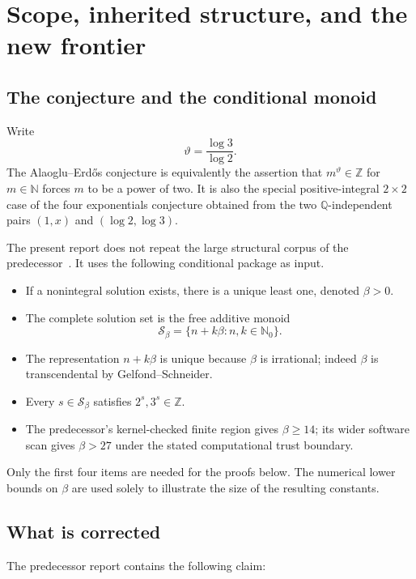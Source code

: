 \documentclass[11pt,oneside]{article}
\theoremstyle{definition}
\theoremstyle{remark}
\newcommand{\N}{\mathbb N}
\newcommand{\Nzero}{\mathbb N_0}
\newcommand{\Z}{\mathbb Z}
\newcommand{\Q}{\mathbb Q}
\newcommand{\Sbeta}{\mathcal S_\beta}
\begin{document}
\tableofcontents
\newpage
{}

\section{Scope, inherited structure, and the new frontier}
\label{sec:scope}

\subsection{The conjecture and the conditional monoid}

Write
\[
 \vartheta=\frac{\log3}{\log2}.
\]
The Alaoglu--Erd\H{o}s conjecture is equivalently the assertion that
$m^\vartheta\in\Z$ for $m\in\N$ forces $m$ to be a power of two.  It is also the special
positive-integral $2\times2$ case of the four exponentials conjecture obtained from the two
$\Q$-independent pairs $(1,x)$ and $(\log2,\log3)$.

The present report does not repeat the large structural corpus of the predecessor~\cite{Unified6}.  It uses
the following conditional package as input.

\begin{itemize}
\item If a nonintegral solution exists, there is a unique least one, denoted $\beta>0$.
\item The complete solution set is the free additive monoid
\[
 \Sbeta=\{n+k\beta:n,k\in\Nzero\}.
\]
\item The representation $n+k\beta$ is unique because $\beta$ is irrational; indeed
$\beta$ is transcendental by Gelfond--Schneider.
\item Every $s\in\Sbeta$ satisfies $2^s,3^s\in\Z$.
\item The predecessor's kernel-checked finite region gives $\beta\ge14$; its wider
software scan gives $\beta>27$ under the stated computational trust boundary.
\end{itemize}

Only the first four items are needed for the proofs below.  The numerical lower bounds on
$\beta$ are used solely to illustrate the size of the resulting constants.

\subsection{What is corrected}

The predecessor report contains the following claim:
\end{document}
